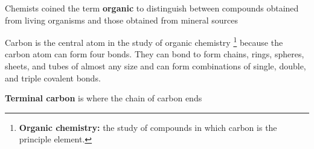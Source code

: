 \begin{bulleted-list}
    \item Chemists coined the term \textbf{organic} to distinguish between compounds obtained from living
    organisms and those obtained from mineral sources
    \item Carbon is the central atom in the study of 
    organic chemistry
    \footnote{\textbf{Organic chemistry:} the study of compounds in which carbon is the principle 
    element.}
    because the carbon atom can form four bonds. They can bond to form chains, rings, spheres, sheets,
    and tubes of almost any size and can form combinations of single, double, and triple covalent bonds.
    \item \textbf{Terminal carbon} is where the chain of carbon ends
\end{bulleted-list}

